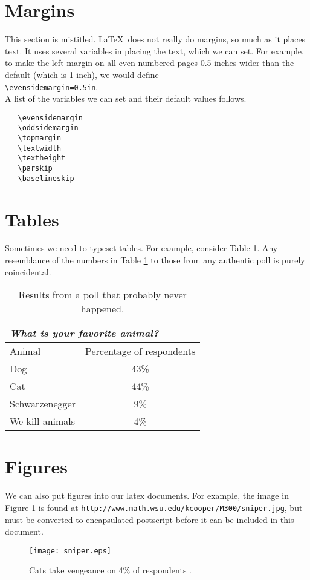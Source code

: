 \documentclass[12pt]{article}
\begin{document}
\section{Margins}
This section is mistitled.  \LaTeX\ does not really do margins,
so much as it places text.  It uses several variables in placing the
text, which we can set.  For example, to make the left margin on
all even-numbered pages 0.5 inches wider than the default (which is 
1 inch), we would define\\
\verb(\evensidemargin=0.5in(.\\
A list of the variables we can set and their default values follows.
\begin{verbatim}
   \evensidemargin
   \oddsidemargin
   \topmargin
   \textwidth
   \textheight
   \parskip
   \baselineskip
\end{verbatim}

\section{Tables}
Sometimes we need to typeset tables.  For example, 
consider Table \ref{animaltable}.  
Any resemblance of the numbers in 
Table \ref{animaltable} to those from any authentic poll is purely coincidental.
\begin{table}
   \begin{center}
      \caption{\label{animaltable}
      Results from a poll that probably never happened.}
      \begin{tabular}{||l|c||}
         \hline
         \cline{1-2}
         \multicolumn{2}{||l||}{{\it What is your favorite animal?}}\\
         \hline
         Animal & Percentage of respondents\\
         \hline
         Dog & 43\%\\
         Cat & 44\%\\
         Schwarzenegger & 9\%\\
         We kill animals & 4\%\\
         \hline
         \hline
      \end{tabular}
   \end{center}
\end{table}

\section{Figures}
We can also put figures into our latex documents.  For example, the
image in Figure \ref{sniper} is found at 
{\tt http://www.math.wsu.edu/kcooper/M300/sniper.jpg}, but must
be converted to encapsulated postscript before it can be included
in this document.
\begin{figure}[ht]
   \begin{center}
      \texttt{[image: sniper.eps]}
      \caption{\label{sniper}
      Cats take vengeance on 4\% of respondents \cite{calvin}.}
      \vfill
   \end{center}
\end{figure}
\end{document}
